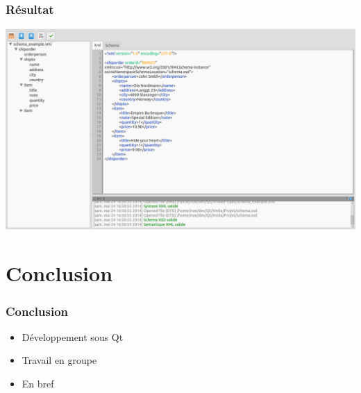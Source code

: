 \documentclass{beamer}
\begin{document}
	\begin{frame}
		\frametitle{Résultat}
		\includegraphics[scale=0.2]{images/final.png}
	\end{frame}


	\section{Conclusion}

	\begin{frame}
		\frametitle{Conclusion}
		\begin{itemize}
			\item Développement sous Qt
			\item Travail en groupe
			\item En bref
		\end{itemize}
	\end{frame}
\end{document}
